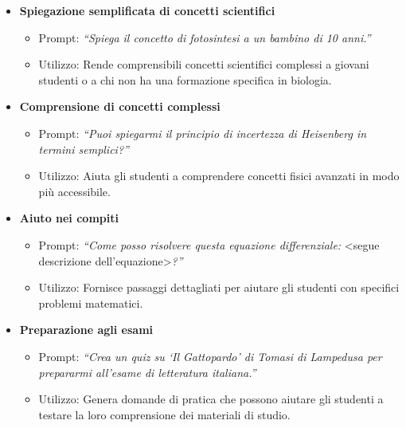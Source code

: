             \begin{itemize}
                \item \textbf{Spiegazione semplificata di concetti scientifici}
                \begin{itemize}
                    \item Prompt: \textit{``Spiega il concetto di fotosintesi a un bambino di 10 anni.''}
                    \item Utilizzo: Rende comprensibili concetti scientifici complessi a giovani studenti o a chi non ha una formazione specifica in biologia.
                \end{itemize}
                
                \item \textbf{Comprensione di concetti complessi}
                \begin{itemize}
                    \item Prompt: \textit{``Puoi spiegarmi il principio di incertezza di Heisenberg in termini semplici?''}
                    \item Utilizzo: Aiuta gli studenti a comprendere concetti fisici avanzati in modo più accessibile.
                \end{itemize}
                
                \item \textbf{Aiuto nei compiti}
                \begin{itemize}
                    \item Prompt: \textit{``Come posso risolvere questa equazione differenziale: }\textless{}segue descrizione dell’equazione\textgreater{}\textit{?''}
                    \item Utilizzo: Fornisce passaggi dettagliati per aiutare gli studenti con specifici problemi matematici.
                \end{itemize}
                
                \item \textbf{Preparazione agli esami}
                \begin{itemize}
                    \item Prompt: \textit{``Crea un quiz su `Il Gattopardo' di Tomasi di Lampedusa per prepararmi all'esame di letteratura italiana.''}
                    \item Utilizzo: Genera domande di pratica che possono aiutare gli studenti a testare la loro comprensione dei materiali di studio.
                \end{itemize}
                

\end{itemize}
